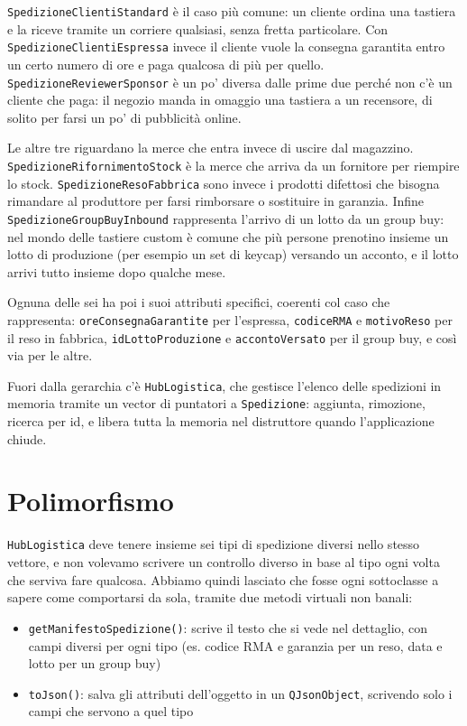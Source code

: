 \documentclass[10pt,a4paper]{article}
\begin{document}
\texttt{SpedizioneClientiStandard} è il caso più comune: un cliente ordina una tastiera e la riceve tramite un corriere qualsiasi, senza fretta particolare. Con \texttt{SpedizioneClientiEspressa} invece il cliente vuole la consegna garantita entro un certo numero di ore e paga qualcosa di più per quello. \texttt{SpedizioneReviewerSponsor} è un po' diversa dalle prime due perché non c'è un cliente che paga: il negozio manda in omaggio una tastiera a un recensore, di solito per farsi un po' di pubblicità online.

Le altre tre riguardano la merce che entra invece di uscire dal magazzino. \texttt{SpedizioneRifornimentoStock} è la merce che arriva da un fornitore per riempire lo stock. \texttt{SpedizioneResoFabbrica} sono invece i prodotti difettosi che bisogna rimandare al produttore per farsi rimborsare o sostituire in garanzia. Infine \texttt{SpedizioneGroupBuyInbound} rappresenta l'arrivo di un lotto da un group buy: nel mondo delle tastiere custom è comune che più persone prenotino insieme un lotto di produzione (per esempio un set di keycap) versando un acconto, e il lotto arrivi tutto insieme dopo qualche mese.

Ognuna delle sei ha poi i suoi attributi specifici, coerenti col caso che rappresenta: \texttt{oreConsegnaGarantite} per l'espressa, \texttt{codiceRMA} e \texttt{motivoReso} per il reso in fabbrica, \texttt{idLottoProduzione} e \texttt{accontoVersato} per il group buy, e così via per le altre.

Fuori dalla gerarchia c'è \texttt{HubLogistica}, che gestisce l'elenco delle spedizioni in memoria tramite un vector di puntatori a \texttt{Spedizione}: aggiunta, rimozione, ricerca per id, e libera tutta la memoria nel distruttore quando l'applicazione chiude.

\section{Polimorfismo}

\texttt{HubLogistica} deve tenere insieme sei tipi di spedizione diversi nello stesso vettore, e non volevamo scrivere un controllo diverso in base al tipo ogni volta che serviva fare qualcosa. Abbiamo quindi lasciato che fosse ogni sottoclasse a sapere come comportarsi da sola, tramite due metodi virtuali non banali:

\begin{itemize}
  \item \texttt{getManifestoSpedizione()}: scrive il testo che si vede nel dettaglio, con campi diversi per ogni tipo (es. codice RMA e garanzia per un reso, data e lotto per un group buy)
  \item \texttt{toJson()}: salva gli attributi dell'oggetto in un \texttt{QJsonObject}, scrivendo solo i campi che servono a quel tipo
\end{itemize}
\end{document}
